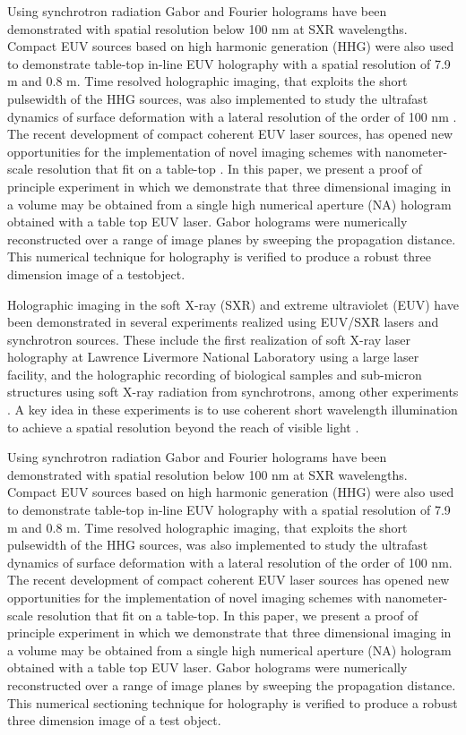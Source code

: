 \documentclass[]{IEEEphot}
\begin{document}
Using synchrotron radiation Gabor and Fourier holograms have been demonstrated \cite{Mizuuchi2003}
 with spatial resolution below 100 nm at SXR wavelengths.  Compact EUV sources based on high harmonic generation (HHG) were also used to demonstrate table-top in-line EUV holography with a spatial resolution of 7.9 m  and 0.8 m.  Time resolved holographic imaging, that exploits the short pulsewidth of the HHG sources, was also implemented to study the ultrafast dynamics of surface deformation with a lateral resolution of the order of 100 nm \cite{Mizuuchi2005,Nakanishi2007}.  The recent development of compact coherent EUV laser sources, \cite{Ott2006} has opened new opportunities for the implementation of novel imaging schemes with nanometer-scale resolution that fit on a table-top \cite{Mizuuchi2003,Ott2006}. In this paper, we present a proof of principle experiment in which we demonstrate that three dimensional imaging in a volume may be obtained from a single high numerical  aperture (NA) hologram obtained with a table top EUV laser. Gabor holograms were numerically reconstructed over a range of image planes by sweeping the propagation distance. This numerical  technique for holography is verified to produce a robust three dimension image of a test\break object.  

Holographic imaging in the soft X-ray (SXR) and extreme ultraviolet (EUV) have \cite{Or2006a} been demonstrated in several experiments realized using EUV/SXR lasers and synchrotron sources. These include the first realization of soft X-ray laser holography at Lawrence Livermore National Laboratory using a large laser facility, and the holographic recording of biological samples and sub-micron structures using soft X-ray radiation from synchrotrons, among other experiments \cite{Or2007, Or2008}.  A key idea in these experiments is to use coherent short wavelength illumination to achieve a spatial resolution beyond the reach of visible light \cite{Or2005a}.  

Using synchrotron radiation Gabor and Fourier holograms have been demonstrated with spatial resolution below 100 nm at SXR wavelengths. Compact EUV sources based on high harmonic generation (HHG) were also used to demonstrate table-top in-line EUV holography with a spatial resolution of 7.9 m and 0.8 m.  Time resolved holographic imaging, that exploits the short pulsewidth of the HHG sources, was also implemented to study the ultrafast dynamics of surface deformation with a lateral resolution of the order of 100 nm.  The recent development of compact coherent EUV laser sources  has opened new opportunities for the implementation of novel imaging schemes with nanometer-scale resolution that fit on a table-top. In this paper, we present a proof of principle experiment in which we demonstrate that three dimensional imaging in a volume may be obtained from a single high numerical  aperture (NA) hologram obtained with a table top EUV laser. Gabor holograms were numerically reconstructed over a range of image planes by sweeping the propagation distance. This numerical sectioning technique for holography is verified to produce a robust three dimension image of a test object.  
\end{document}
